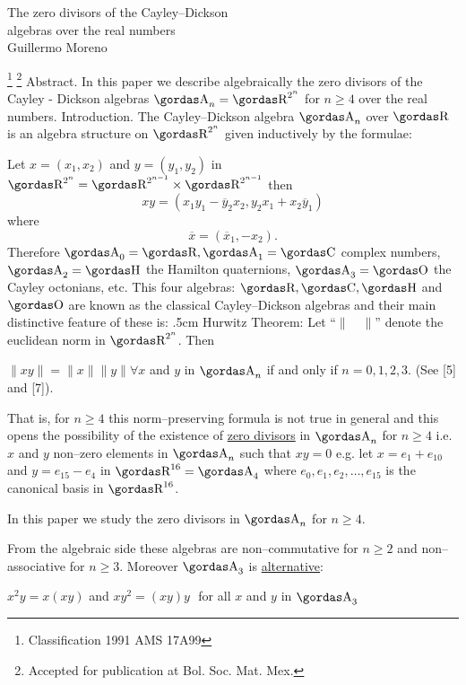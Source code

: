 \bs
\begin{center}
{\large\bsbf The zero divisors of the Cayley--Dickson}\\
{\large\bsbf algebras over the real numbers} \\[.5cm]
Guillermo Moreno
\end{center}
\footnote{Classification 1991 AMS 17A99}
\footnote{Accepted for publication at Bol. Soc. Mat. Mex.}
\noindent
{\bsbf Abstract. } In this paper we describe algebraically the zero divisors of the Cayley - Dickson algebras
$\a_{n} = \erre^{2^n}$ for $n\ge 4$ over the real numbers.
\noindent
{\bsbf Introduction.} The Cayley--Dickson algebra $\a_{n}$ 
over $\erre$ 
is an algebra structure on $\erre^{2^n}$ given inductively by the 
formulae:
\par 
Let $x=(x_{1},x_{2})$ and $y=(y_{1},y_{2})$ in 
$\erre^{2^n}=\erre^{2^{n-1}}\times\erre^{2^{n-1}}$ then
$$xy=(x_{1}y_{1}-\overline{y}_{2}x_{2},y_{2}x_{1}+x_{2}\overline{y}_{1})$$
where
$$\overline{x}=(\overline{x}_{1},-x_{2}).$$
Therefore $\a_{0}=\erre, \a_{1}=\ce$ complex numbers, $\a_{2}=\ache$ the
Hamilton quaternions, $\a_{3}=\o$ the Cayley octonians, etc. This four algebras:
$\erre, \ce, \ache$ and $\o$ are known as the classical Cayley--Dickson algebras
and their main distinctive feature of these is:
\vglue.5cm
\noindent
{\bsbf Hurwitz Theorem:} Let ``$\parallel\quad\parallel$'' denote the euclidean 
norm in $\erre^{2^n}$. Then
\par 
$\parallel xy\parallel=\parallel x\parallel \parallel y\parallel \forall x$
and $y$ in $\a_{n}$ if and only if $n=0,1,2,3$. (See [5] and [7]).
\par 
That is, for $n\ge 4$ this norm--preserving formula is not 
true in general and this 
opens the possibility of the existence of \underline{zero divisors} in $\a_{n}$ for
$n\ge 4$ i.e. $x$ and $y$ non--zero elements in $\a_{n}$ such that
$xy=0$ e.g. let $x=e_{1}+e_{10}$ and $y=e_{15}-e_{4}$ in $\erre^{16}=\a_{4}$ where
$e_{0},e_{1},e_{2},\ldots,e_{15}$ is the canonical basis in $\erre^{16}$.
\par 
In this paper we study  the zero divisors in 
$\a_{n}$ for $n\ge 4$.
\par 
From the algebraic side these algebras are non--commutative for $n\ge 2$ and
non--associative for $n\ge 3$. Moreover $\a_{3}$ is \underline{alternative}:
\par 
$x^{2}y=x(xy)$ and $xy^{2}=(xy)y\,\,$ for all $x$ and $y$ in $\a_{3}$

